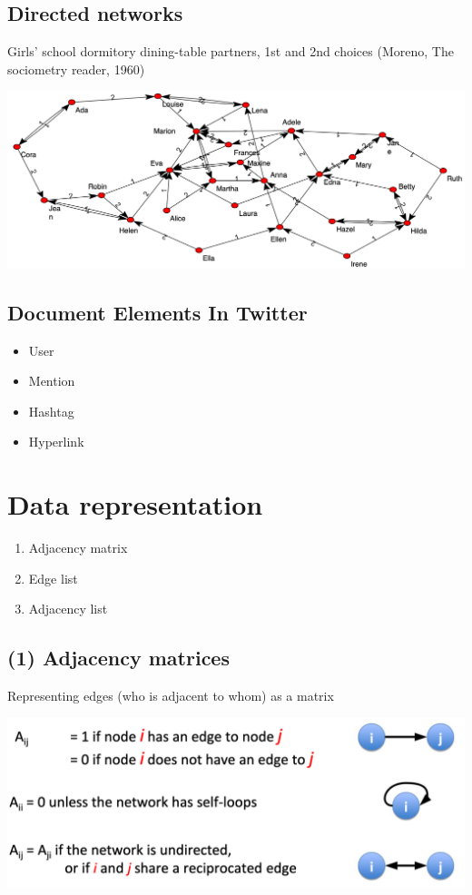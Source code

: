 \documentclass[11pt]{article}
\theoremstyle{definition}
\begin{document}
\subsection{Directed networks}
Girls’ school dormitory dining-table partners, 1st and 2nd choices
(Moreno, The sociometry reader, 1960)

\includegraphics[width=\textwidth/2]{8.png}

\subsection{Document
Elements
In Twitter}
\begin{itemize}
    \item User
    \item Mention
    \item Hashtag
    \item Hyperlink
\end{itemize}

\section{Data representation}
\begin{enumerate}
    \item Adjacency matrix
    \item Edge list
    \item Adjacency list
\end{enumerate}

\subsection{(1) Adjacency matrices}
Representing edges (who is adjacent to whom) as a matrix

\includegraphics[width=\textwidth/2]{9.png}
\end{document}
